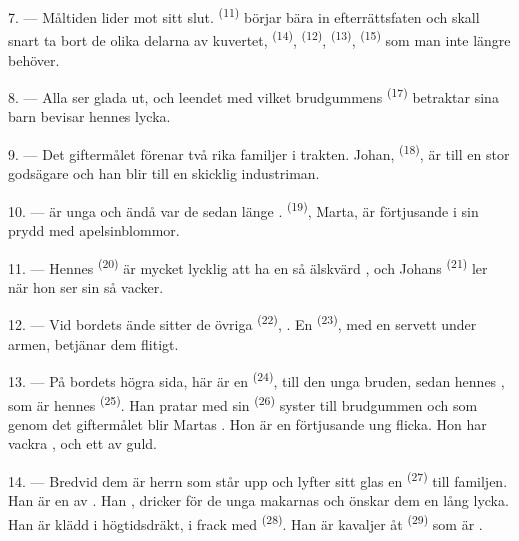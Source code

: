 7. --- Måltiden lider mot sitt slut.  \textsuperscript{(11)}
börjar bära in efterrättsfaten och skall snart ta bort de olika delarna av
kuvertet,  \textsuperscript{(14)}, 
\textsuperscript{(12)},  \textsuperscript{(13)},  \textsuperscript{(15)} som man inte längre behöver.

\VUsaut{3.0mm}

8. --- Alla ser glada ut, och leendet med vilket brudgummens 
\textsuperscript{(17)} betraktar sina barn bevisar hennes lycka.

9. --- Det giftermålet förenar två rika familjer i trakten. Johan,
 \textsuperscript{(18)}, är  till en stor godsägare
och han blir  till en skicklig industriman.

10. ---  är unga och ändå var de sedan länge
.  \textsuperscript{(19)}, Marta, är
förtjusande i sin  prydd med apelsinblommor.

11. --- Hennes  \textsuperscript{(20)} är mycket lycklig att ha
en så älskvärd , och Johans 
\textsuperscript{(21)} ler när hon ser sin  så vacker.

12. --- Vid bordets ände sitter de övriga 
\textsuperscript{(22)}, . En
 \textsuperscript{(23)}, med en servett under armen, betjänar
dem flitigt.

\VUsaut{3.0mm}

13. --- På bordets högra sida, här är en 
\textsuperscript{(24)},  till den unga bruden, sedan hennes
, som är hennes  \textsuperscript{(25)}. Han
pratar med sin  \textsuperscript{(26)} syster till brudgummen och
som genom det giftermålet blir Martas . Hon är en förtjusande
ung flicka. Hon har vackra , och ett
 av guld.

14. --- Bredvid dem är herrn som står upp och lyfter sitt glas en 
\textsuperscript{(27)} till familjen. Han är en av . Han , dricker för de unga makarnas
 och önskar dem en lång lycka. Han är klädd i högtidsdräkt, i frack
med  \textsuperscript{(28)}. Han är kavaljer åt
 \textsuperscript{(29)} som är .

